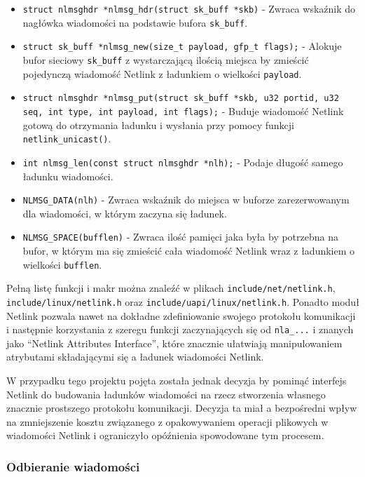 \begin{itemize}
\itemsep1pt\parskip0pt
\item
  \texttt{struct nlmsghdr *nlmsg\_hdr(struct sk\_buff *skb)} - Zwraca
  wskaźnik do nagłówka wiadomości na podstawie bufora \texttt{sk\_buff}.
\item
  \texttt{struct sk\_buff *nlmsg\_new(size\_t payload, gfp\_t flags);} -
  Alokuje bufor sieciowy \texttt{sk\_buff} z wystarczającą ilością
  miejsca by zmieścić pojedynczą wiadomość Netlink z ładunkiem o
  wielkości \texttt{payload}.
\item
  \texttt{struct nlmsghdr *nlmsg\_put(struct sk\_buff *skb, u32 portid, u32 seq, int type, int payload, int flags);}
  - Buduje wiadomość Netlink gotową do otrzymania ładunku i wysłania
  przy pomocy funkcji \texttt{netlink\_unicast()}.
\item
  \texttt{int nlmsg\_len(const struct nlmsghdr *nlh);} - Podaje długość
  samego ładunku wiadomości.
\item
  \texttt{NLMSG\_DATA(nlh)} - Zwraca wskaźnik do miejsca w buforze
  zarezerwowanym dla wiadomości, w którym zaczyna się ładunek.
\item
  \texttt{NLMSG\_SPACE(bufflen)} - Zwraca ilość pamięci jaka była by
  potrzebna na bufor, w którym ma się zmieścić cała wiadomość Netlink
  wraz z ładunkiem o wielkości \texttt{bufflen}.
\end{itemize}

Pełną listę funkcji i makr można znaleźć w plikach
\texttt{include/net/netlink.h}, \texttt{include/linux/netlink.h} oraz
\texttt{include/uapi/linux/netlink.h}. Ponadto moduł Netlink pozwala
nawet na dokładne zdefiniowanie swojego protokołu komunikacji i
następnie korzystania z szeregu funkcji zaczynających się od
\texttt{nla\_...} i znanych jako ``Netlink Attributes Interface'', które
znacznie ułatwiają manipulowaniem atrybutami składającymi się a ładunek
wiadomości Netlink.

W przypadku tego projektu pojęta została jednak decyzja by pominąć
interfejs Netlink do budowania ładunków wiadomości na rzecz stworzenia
własnego znacznie prostszego protokołu komunikacji. Decyzja ta miał a
bezpośredni wpływ na zmniejszenie kosztu związanego z opakowywaniem
operacji plikowych w wiadomości Netlink i ograniczyło opóźnienia
spowodowane tym procesem.

\subsubsection{Odbieranie wiadomości}

